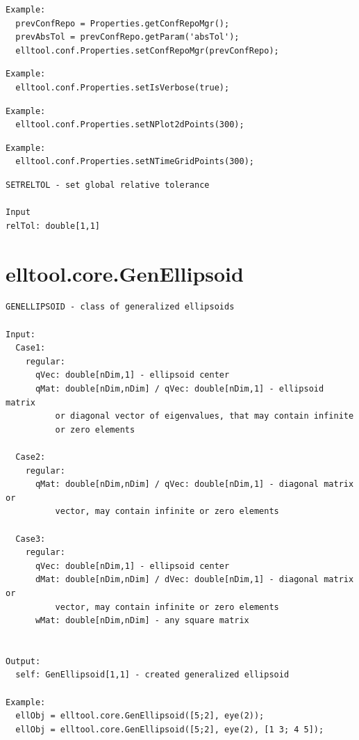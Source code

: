 \documentclass[letterpaper,10pt,english]{sphinxmanual}
\begin{document}
\begin{Verbatim}[commandchars=\\\{\}]
Example:
  prevConfRepo = Properties.getConfRepoMgr();
  prevAbsTol = prevConfRepo.getParam('absTol');
  elltool.conf.Properties.setConfRepoMgr(prevConfRepo);
\end{Verbatim}

\begin{Verbatim}[commandchars=\\\{\}]
Example:
  elltool.conf.Properties.setIsVerbose(true);
\end{Verbatim}

\begin{Verbatim}[commandchars=\\\{\}]
Example:
  elltool.conf.Properties.setNPlot2dPoints(300);
\end{Verbatim}

\begin{Verbatim}[commandchars=\\\{\}]
Example:
  elltool.conf.Properties.setNTimeGridPoints(300);
\end{Verbatim}

\begin{Verbatim}[commandchars=\\\{\}]
SETRELTOL - set global relative tolerance

Input
relTol: double[1,1]
\end{Verbatim}


\section{elltool.core.GenEllipsoid}
\label{chap_func:elltool-core-genellipsoid}
\begin{Verbatim}[commandchars=\\\{\}]
GENELLIPSOID - class of generalized ellipsoids

Input:
  Case1:
    regular:
      qVec: double[nDim,1] - ellipsoid center
      qMat: double[nDim,nDim] / qVec: double[nDim,1] - ellipsoid matrix
          or diagonal vector of eigenvalues, that may contain infinite
          or zero elements

  Case2:
    regular:
      qMat: double[nDim,nDim] / qVec: double[nDim,1] - diagonal matrix or
          vector, may contain infinite or zero elements

  Case3:
    regular:
      qVec: double[nDim,1] - ellipsoid center
      dMat: double[nDim,nDim] / dVec: double[nDim,1] - diagonal matrix or
          vector, may contain infinite or zero elements
      wMat: double[nDim,nDim] - any square matrix


Output:
  self: GenEllipsoid[1,1] - created generalized ellipsoid

Example:
  ellObj = elltool.core.GenEllipsoid([5;2], eye(2));
  ellObj = elltool.core.GenEllipsoid([5;2], eye(2), [1 3; 4 5]);
\end{Verbatim}
\end{document}
